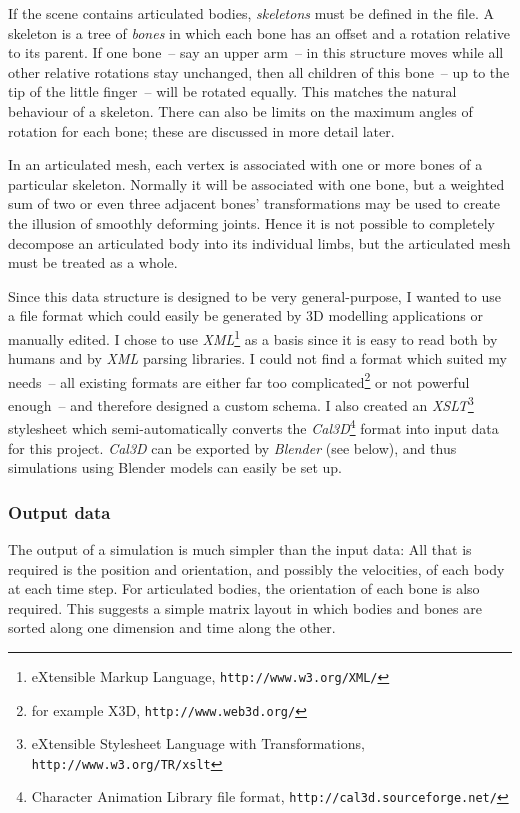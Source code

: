 If the scene contains articulated bodies, \emph{skeletons} must be defined in the file. A skeleton
is a tree of \emph{bones} in which each bone has an offset and a rotation relative to its parent.
If one bone~-- say an upper arm~-- in this structure moves while all other relative rotations stay
unchanged, then all children of this bone~-- up to the tip of the little finger~-- will be rotated
equally. This matches the natural behaviour of a skeleton. There can also be limits on the maximum
angles of rotation for each bone; these are discussed in more detail later.

In an articulated mesh, each vertex is associated with one or more bones of a particular skeleton.
Normally it will be associated with one bone, but a weighted sum of two or even three adjacent
bones' transformations may be used to create the illusion of smoothly deforming joints. Hence it
is not possible to completely decompose an articulated body into its individual limbs, but the
articulated mesh must be treated as a whole.

Since this data structure is designed to be very general-purpose, I wanted to use a file format
which could easily be generated by 3D modelling applications or manually edited. I chose to use
\textsl{XML}\footnote{eXtensible Markup Language, \texttt{http://www.w3.org/XML/}} as a basis
since it is easy to read both by humans and by \textsl{XML} parsing libraries. I could not
find a format which suited my needs~-- all existing formats are either far too
complicated\footnote{for example X3D, \texttt{http://www.web3d.org/}} or not
powerful enough~-- and therefore designed a custom schema. I also created an
\textsl{XSLT}\footnote{eXtensible Stylesheet Language with Transformations,
\texttt{http://www.w3.org/TR/xslt}} stylesheet which semi-automatically converts the
\textsl{Cal3D}\footnote{Character Animation Library file format, \texttt{http://cal3d.sourceforge.net/}}
format into input data for this project. \textsl{Cal3D} can be exported by \textsl{Blender}
(see below), and thus simulations using Blender models can easily be set up.

\subsubsection{Output data}
The output of a simulation is much simpler than the input data: All that is required is the
position and orientation, and possibly the velocities, of each body at each time step. For
articulated bodies, the orientation of each bone is also required. This suggests a simple
matrix layout in which bodies and bones are sorted along one dimension and time along
the other.

